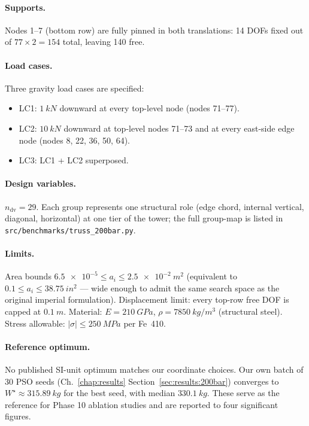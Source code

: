 \paragraph{Supports.} Nodes 1--7 (bottom row) are fully pinned in
both translations: 14 DOFs fixed out of $77\times 2=154$ total,
leaving 140 free.

\paragraph{Load cases.} Three gravity load cases are specified:
\begin{itemize}
  \item LC1: $\SI{1}{kN}$ downward at every top-level node
    (nodes 71--77).
  \item LC2: $\SI{10}{kN}$ downward at top-level nodes 71--73
    and at every east-side edge node (nodes 8, 22, 36, 50, 64).
  \item LC3: LC1 + LC2 superposed.
\end{itemize}

\paragraph{Design variables.} $n_{\mathrm{dv}}=29$. Each group
represents one structural role (edge chord, internal vertical,
diagonal, horizontal) at one tier of the tower; the full
group-map is listed in \texttt{src/benchmarks/truss\_200bar.py}.

\paragraph{Limits.} Area bounds $\num{6.5e-5}\le a_i\le
\SI{2.5e-2}{m^2}$ (equivalent to
$\SI{0.1}\le a_i\le\SI{38.75}{in^2}$ --- wide enough to admit
the same search space as the original imperial formulation).
Displacement limit: every top-row free DOF is capped at
$\SI{0.1}{m}$. Material: $E=\SI{210}{GPa}$,
$\rho=\SI{7850}{kg/m^3}$ (structural steel). Stress allowable:
$|\sigma|\le\SI{250}{MPa}$ per Fe~410.

\paragraph{Reference optimum.} No published SI-unit optimum
matches our coordinate choices. Our own batch of 30
PSO seeds (Ch.~\ref{chap:results} Section~\ref{sec:results:200bar})
converges to $W^\star\approx\SI{315.89}{kg}$ for the best seed,
with median $\SI{330.1}{kg}$. These serve as the reference for
Phase 10 ablation studies and are reported to four significant
figures.

